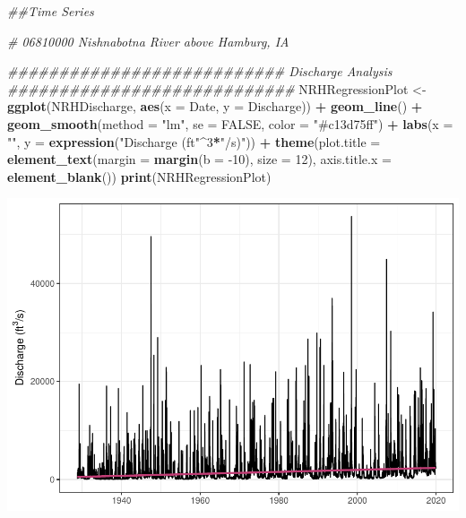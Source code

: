 \documentclass[12pt,]{article}
\newenvironment{Shaded}{\begin{snugshade}}{\end{snugshade}}
\newcommand{\CommentTok}[1]{\textcolor[rgb]{0.56,0.35,0.01}{\textit{#1}}}
\newcommand{\DataTypeTok}[1]{\textcolor[rgb]{0.13,0.29,0.53}{#1}}
\newcommand{\DecValTok}[1]{\textcolor[rgb]{0.00,0.00,0.81}{#1}}
\newcommand{\KeywordTok}[1]{\textcolor[rgb]{0.13,0.29,0.53}{\textbf{#1}}}
\newcommand{\NormalTok}[1]{#1}
\newcommand{\OperatorTok}[1]{\textcolor[rgb]{0.81,0.36,0.00}{\textbf{#1}}}
\newcommand{\OtherTok}[1]{\textcolor[rgb]{0.56,0.35,0.01}{#1}}
\newcommand{\StringTok}[1]{\textcolor[rgb]{0.31,0.60,0.02}{#1}}
\begin{document}
\begin{Shaded}
\begin{Highlighting}[]
\CommentTok{##Time Series}

\CommentTok{# 06810000 Nishnabotna River above Hamburg, IA }

\CommentTok{########################### Discharge Analysis ############################}
\NormalTok{NRHRegressionPlot <-}\StringTok{ }
\StringTok{  }\KeywordTok{ggplot}\NormalTok{(NRHDischarge, }\KeywordTok{aes}\NormalTok{(}\DataTypeTok{x =}\NormalTok{ Date, }\DataTypeTok{y =}\NormalTok{ Discharge)) }\OperatorTok{+}
\StringTok{  }\KeywordTok{geom_line}\NormalTok{() }\OperatorTok{+}
\StringTok{  }\KeywordTok{geom_smooth}\NormalTok{(}\DataTypeTok{method =} \StringTok{"lm"}\NormalTok{, }\DataTypeTok{se =} \OtherTok{FALSE}\NormalTok{, }\DataTypeTok{color =} \StringTok{"#c13d75ff"}\NormalTok{) }\OperatorTok{+}
\StringTok{  }\KeywordTok{labs}\NormalTok{(}\DataTypeTok{x =} \StringTok{""}\NormalTok{, }\DataTypeTok{y =} \KeywordTok{expression}\NormalTok{(}\StringTok{"Discharge (ft"}\OperatorTok{^}\DecValTok{3}\OperatorTok{*}\StringTok{"/s)"}\NormalTok{)) }\OperatorTok{+}\StringTok{ }
\StringTok{  }\KeywordTok{theme}\NormalTok{(}\DataTypeTok{plot.title =} \KeywordTok{element_text}\NormalTok{(}\DataTypeTok{margin =} \KeywordTok{margin}\NormalTok{(}\DataTypeTok{b =} \DecValTok{-10}\NormalTok{), }\DataTypeTok{size =} \DecValTok{12}\NormalTok{), }
        \DataTypeTok{axis.title.x =} \KeywordTok{element_blank}\NormalTok{())}
\KeywordTok{print}\NormalTok{(NRHRegressionPlot)}
\end{Highlighting}
\end{Shaded}

\includegraphics{Project_Template_files/figure-latex/unnamed-chunk-6-1.pdf}
\end{document}
